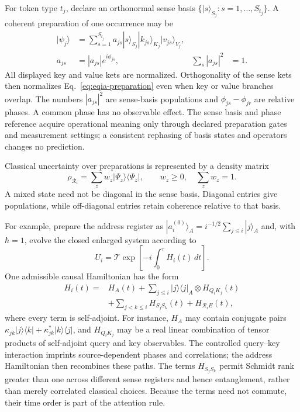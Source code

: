 \documentclass[
  aps,
  reprint,
  superscriptaddress,
  floatfix,
  nofootinbib,
  longbibliography
]{revtex4-2}
\begin{document}
For token type $t_j$, declare an orthonormal sense basis
$\{|s\rangle_{S_j}:s=1,\ldots,S_{t_j}\}$.  A coherent preparation of one
occurrence may be
\begin{equation}
\begin{aligned}
 |\psi_j\rangle
 &=\sum_{s=1}^{S_{t_j}}a_{js}
 |s\rangle_{S_j}|k_{js}\rangle_{K_j}|v_{js}\rangle_{V_j},\\
 a_{js}&=|a_{js}|e^{i\phi_{js}},
 &\sum_s|a_{js}|^2&=1 .
\end{aligned}
\label{eq:eqia-preparation}
\end{equation}
All displayed key and value kets are normalized.  Orthogonality of the sense
kets then normalizes Eq.~\eqref{eq:eqia-preparation} even when key or value
branches overlap.  The numbers $|a_{js}|^2$ are sense-basis populations and
$\phi_{js}-\phi_{jr}$ are relative phases.  A common phase has no observable
effect.  The sense basis and phase reference acquire operational meaning only
through declared preparation gates and measurement settings; a consistent
rephasing of basis states and operators changes no prediction.

Classical uncertainty over preparations is represented by a density matrix
\begin{equation}
 \rho_{\mathcal R_i}
 =\sum_z w_z|\Psi_z\rangle\langle\Psi_z|,
 \qquad w_z\geq0,
 \quad\sum_z w_z=1 .
\label{eq:eqia-density}
\end{equation}
A mixed state need not be diagonal in the sense basis.  Diagonal entries give
populations, while off-diagonal entries retain coherence relative to that
basis.

For example, prepare the address register as
$|a_i^{(0)}\rangle_A=i^{-1/2}\sum_{j\leq i}|j\rangle_A$ and, with
$\hbar=1$, evolve the closed enlarged system according to
\begin{equation}
 U_i=\mathcal T\exp\left[-i\int_0^\tau H_i(t)\,dt\right].
\label{eq:eqia-unitary}
\end{equation}
One admissible causal Hamiltonian has the form
\begin{equation}
\begin{aligned}
 H_i(t)={}&H_A(t)
 +\sum_{j\leq i}|j\rangle\langle j|_A
       \otimes H_{Q_iK_j}(t)\\
 &+\sum_{j<k\leq i}H_{S_jS_k}(t)
 +H_{\mathcal R_iE}(t),
\end{aligned}
\label{eq:eqia-hamiltonian}
\end{equation}
where every term is self-adjoint.  For instance, $H_A$ may contain conjugate
pairs $\kappa_{jk}|j\rangle\langle k|+\kappa_{jk}^*|k\rangle\langle j|$,
and $H_{Q_iK_j}$ may be a real linear combination of tensor products of
self-adjoint query and key observables.  The controlled query--key interaction
imprints source-dependent phases and correlations; the address Hamiltonian
then recombines these paths.  The terms $H_{S_jS_k}$ permit Schmidt rank
greater than one across different sense registers and hence entanglement,
rather than merely correlated classical choices.  Because the terms need not
commute, their time order is part of the attention rule.
\end{document}
